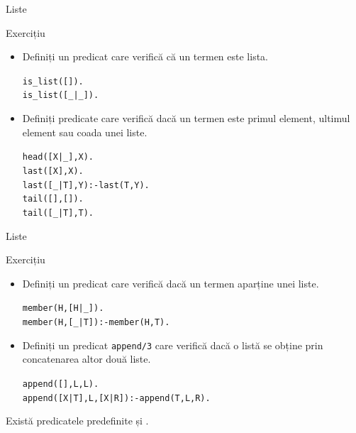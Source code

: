 \documentclass[xcolor=x11names,compress,10pt]{beamer}
\begin{document}
\begin{frame}{Liste}
\vspace*{0.5cm}

\begin{block}{Exercițiu}
\begin{itemize}
\item Definiți un predicat care verifică că un termen este lista.

\begin{alltt}
is\_list([]).\\
is\_list([\_|\_]).
\end{alltt}
\pause

\item Definiți predicate care verifică dacă un termen este  primul element, ultimul element sau coada unei liste.
\vspace*{0.2cm}

\begin{alltt}
head([X|\_],X). \\

last([X],X). \\
last([\_|T],Y):- last(T,Y).\\
 
tail([],[]).\\
tail([\_|T],T).
\end{alltt}
\end{itemize}
\end{block}



\end{frame}

\begin{frame}{Liste}
\vspace*{0.3cm}

\begin{block}{Exercițiu}
\begin{itemize}
\item Definiți un predicat care verifică dacă un termen aparține unei liste.

\begin{alltt}
member(H, [H|\_]).\\
member(H, [\_|T]) :- member(H,T).
\end{alltt}


\medskip\pause

\item Definiți un predicat \texttt{append/3} care verifică dacă o listă se obține prin concatenarea altor două liste.

\begin{alltt}
append([],L,L).\\
append([X|T],L, [X|R]) :- append(T,L,R).\\
\end{alltt}

\end{itemize}
\end{block}

\pause
Există predicatele predefinite  și 
. 
\end{frame}
\end{document}
